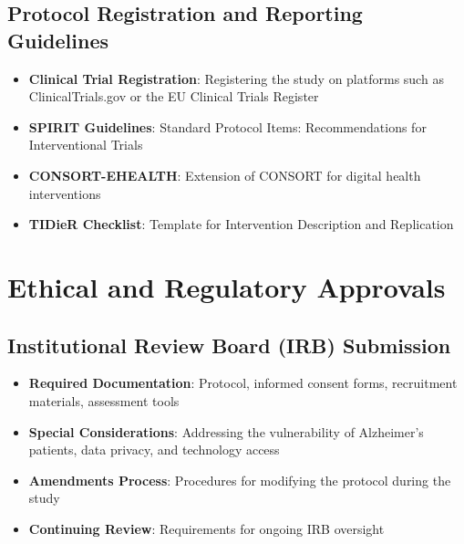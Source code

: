 \subsection{Protocol Registration and Reporting Guidelines}
\begin{itemize}
    \item \textbf{Clinical Trial Registration}: Registering the study on platforms such as ClinicalTrials.gov or the EU Clinical Trials Register
    
    \item \textbf{SPIRIT Guidelines}: Standard Protocol Items: Recommendations for Interventional Trials
    
    \item \textbf{CONSORT-EHEALTH}: Extension of CONSORT for digital health interventions
    
    \item \textbf{TIDieR Checklist}: Template for Intervention Description and Replication
\end{itemize}

\section{Ethical and Regulatory Approvals}
\subsection{Institutional Review Board (IRB) Submission}
\begin{itemize}
    \item \textbf{Required Documentation}: Protocol, informed consent forms, recruitment materials, assessment tools
    
    \item \textbf{Special Considerations}: Addressing the vulnerability of Alzheimer's patients, data privacy, and technology access
    
    \item \textbf{Amendments Process}: Procedures for modifying the protocol during the study
    
    \item \textbf{Continuing Review}: Requirements for ongoing IRB oversight
\end{itemize}

